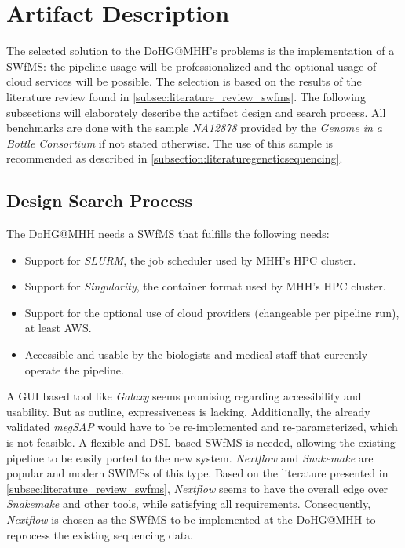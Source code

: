 \section{Artifact Description}\label{sec:artifact_description}

The selected solution to the \ac{DoHG@MHH}'s problems is the implementation of a \ac{SWfMS}: the pipeline usage will be professionalized and the optional usage of cloud services will be possible. The selection is based on the results of the literature review found in \cref{subsec:literature_review_swfms}. The following subsections will elaborately describe the artifact design and search process. All benchmarks are done with the sample \textit{NA12878} provided by the \textit{Genome in a Bottle Consortium} if not stated otherwise. The use of this sample is recommended as described in  \cref{subsection:literaturegeneticsequencing}.

\subsection{Design Search Process}
The \ac{DoHG@MHH} needs a \ac{SWfMS} that fulfills the following needs:
\begin{itemize}
    \item Support for \textit{\ac{SLURM}}, the job scheduler used by \ac{MHH}'s \ac{HPC} cluster.
    \item Support for \textit{Singularity}, the container format used by \ac{MHH}'s \ac{HPC} cluster.
    \item Support for the optional use of cloud providers (changeable per pipeline run), at least \ac{AWS}.
    \item Accessible and usable by the biologists and medical staff that currently operate the pipeline.
\end{itemize}

A \ac{GUI} based tool like \textit{Galaxy} seems promising regarding accessibility and usability. But as \citeauthor{wratten2021} \autocite{wratten2021} outline, expressiveness is lacking. Additionally, the already validated \textit{\ac{megSAP}} would have to be re-implemented and re-parameterized, which is not feasible. A flexible and \ac{DSL} based \ac{SWfMS} is needed, allowing the existing pipeline to be easily ported to the new system. \textit{Nextflow} and \textit{Snakemake} are popular and modern \acp{SWfMS} of this type. Based on the literature presented in \cref{subsec:literature_review_swfms}, \textit{Nextflow} seems to have the overall edge over \textit{Snakemake} and other tools, while satisfying all requirements. Consequently, \textit{Nextflow} is chosen as the \ac{SWfMS} to be implemented at the \ac{DoHG@MHH} to reprocess the existing sequencing data.

